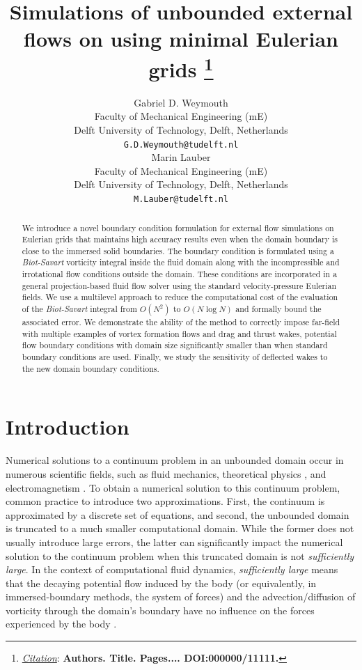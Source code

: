 \documentclass{article}
\title{Simulations of unbounded external flows on using minimal Eulerian grids
\thanks{\textit{\underline{Citation}}: 
\textbf{Authors. Title. Pages.... DOI:000000/11111.}} 
}
\author{
    Gabriel D. Weymouth\\
    Faculty of Mechanical Engineering (mE) \\
    Delft University of Technology, Delft, Netherlands \\
    \texttt{G.D.Weymouth@tudelft.nl} \\
    \AND
    Marin Lauber\\
    Faculty of Mechanical Engineering (mE) \\
    Delft University of Technology, Delft, Netherlands \\
    \texttt{M.Lauber@tudelft.nl} \\
}
\begin{document}
\maketitle


\begin{abstract}
We introduce a novel boundary condition formulation for external flow simulations on Eulerian grids that maintains high accuracy results even when the domain boundary is close to the immersed solid boundaries. The boundary condition is formulated using a \emph{Biot-Savart} vorticity integral inside the fluid domain along with the incompressible and irrotational flow conditions outside the domain. These conditions are incorporated in a general projection-based fluid flow solver using the standard velocity-pressure Eulerian fields. We use a multilevel approach to reduce the computational cost of the evaluation of the \emph{Biot-Savart} integral from $O(N^2)$ to $O(N\log N)$ and formally bound the associated error. We demonstrate the ability of the method to correctly impose far-field with multiple examples of vortex formation flows and drag and thrust wakes,  potential flow boundary conditions with domain size significantly smaller than when standard boundary conditions are used. Finally, we study the sensitivity of deflected wakes to the new domain boundary conditions. 
\end{abstract}



\section{Introduction}
Numerical solutions to a continuum problem in an unbounded domain occur in numerous scientific fields, such as fluid mechanics, theoretical physics \cite{Levy2022SolvingMethod}, and electromagnetism \cite{}. To obtain a numerical solution to this continuum problem, common practice to introduce two approximations. First, the continuum is approximated by a discrete set of equations, and second, the unbounded domain is truncated to a much smaller computational domain. While the former does not usually introduce large errors, the latter can significantly impact the numerical solution to the continuum problem when this truncated domain is not \emph{sufficiently large}. In the context of computational fluid dynamics, \emph{sufficiently large} means that the decaying potential flow induced by the body (or equivalently, in immersed-boundary methods, the system of forces) and the advection/diffusion of vorticity through the domain's boundary have no influence on the forces experienced by the body \cite{Colonius2008}.
\end{document}
